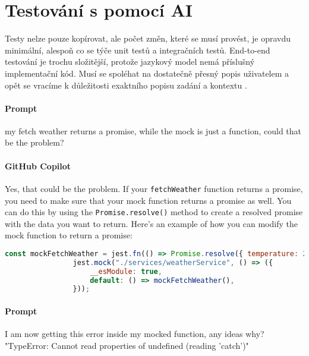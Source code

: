 \documentclass[FM,DP]{tulthesis}
\begin{document}
		\section{Testování s pomocí AI}
		
		Testy nelze pouze kopírovat, ale počet změn, které se musí provést, je opravdu minimální, alespoň co se týče unit testů a integračních testů. End-to-end testování je trochu složitější, protože jazykový model nemá příslušný implementační kód. Musí se spoléhat na dostatečně přesný popis uživatelem a opět se vracíme k důležitosti exaktního popisu zadání a kontextu \cite{testing}.
		
		\vspace{0.6em}
		\begin{tcolorbox}[colback=white,colframe=black,title=Konverzace s opakovaním kódu]
			\paragraph{Prompt}
			my fetch weather returns a promise, while the mock is just a function, could that be the problem?
			
			\vspace{0.6em}
			
			\paragraph{GitHub Copilot}
			Yes, that could be the problem. If your \verb|fetchWeather| function returns a promise, you need to make sure that your mock function returns a promise as well. You can do this by using the \verb|Promise.resolve()| method to create a resolved promise with the data you want to return. Here's an example of how you can modify the mock function to return a promise:
			
			\vspace{0.6em}
			
			\begin{lstlisting}[language=JavaScript]
				const mockFetchWeather = jest.fn(() => Promise.resolve({ temperature: 20 }));
				jest.mock("./services/weatherService", () => ({
					__esModule: true,
					default: () => mockFetchWeather(),
				}));
			\end{lstlisting}
			
			\vspace{0.6em}
			
			
			\paragraph{Prompt}
			I am now getting this error inside my mocked function, any ideas why? "TypeError: Cannot read properties of undefined (reading 'catch')"
			

\end{tcolorbox}
\end{document}
